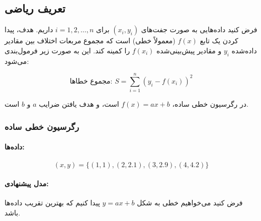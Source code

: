 \subsection*{تعریف ریاضی}

فرض کنید داده‌هایی به صورت جفت‌های \((x_i, y_i)\) برای \(i = 1, 2, \ldots, n\) داریم. هدف، پیدا کردن یک تابع \(f(x)\) (معمولاً خطی) است که مجموع مربعات اختلاف بین مقادیر داده‌شده \(y_i\) و مقادیر پیش‌بینی‌شده \(f(x_i)\) را کمینه کند. این به صورت زیر فرمول‌بندی می‌شود:

\[
\text{مجموع خطاها: } S = \sum_{i=1}^n \left( y_i - f(x_i) \right)^2
\]

در رگرسیون خطی ساده، \(f(x) = ax + b\) است، و هدف یافتن ضرایب \(a\) و \(b\) است.
\begin{example}
	
	\subsubsection*{ رگرسیون خطی ساده}
	\paragraph{داده‌ها:}
	\[
	(x, y) = \{(1, 1), (2, 2.1), (3, 2.9), (4, 4.2)\}
	\]
	
	\paragraph{مدل پیشنهادی:}
	فرض کنید می‌خواهیم خطی به شکل \(y = ax + b\) پیدا کنیم که بهترین تقریب داده‌ها باشد.
\end{example}
